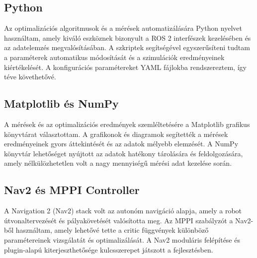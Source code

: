 \subsection{Python}
Az optimalizációs algoritmusok és a mérések automatizálására Python nyelvet használtam, amely kiváló eszköznek bizonyult a ROS 2 interfészek kezelésében és az adatelemzés megvalósításában. A szkriptek segítségével egyszerűsíteni tudtam a paraméterek automatikus módosítását és a szimulációk eredményeinek kiértékelését. A konfigurációs paramétereket YAML fájlokba rendszereztem, így téve követhetővé.

\subsection{Matplotlib és NumPy}
A mérések és az optimalizációs eredmények szemléltetésére a Matplotlib grafikus könyvtárat választottam. A grafikonok és diagramok segítették a mérések eredményeinek gyors áttekintését és az adatok mélyebb elemzését. A NumPy könyvtár lehetőséget nyújtott az adatok hatékony tárolására és feldolgozására, amely nélkülözhetetlen volt a nagy mennyiségű mérési adat kezelése során.

\subsection{Nav2 és MPPI Controller}
A Navigation 2 (Nav2) stack volt az autonóm navigáció alapja, amely a robot útvonaltervezését és pályakövetését valósította meg. Az MPPI szabályzót a Nav2-ből használtam, amely lehetővé tette a critic függvények különböző paramétereinek vizsgálatát és optimalizálását. A Nav2 moduláris felépítése és plugin-alapú kiterjeszthetősége kulcsszerepet játszott a fejlesztésben.

